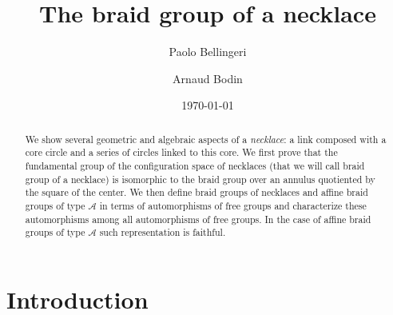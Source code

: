\documentclass[11pt]{amsart}
\title{The braid group of a necklace}
\date{\today}
\author{Paolo Bellingeri}
\author{Arnaud Bodin}
\begin{document}
\begin{abstract}
We show several geometric and algebraic aspects of a \emph{necklace}:
a link composed with a core circle and a series of circles linked to this core.
We first prove that the fundamental group of the configuration space of necklaces 
(that we will call  braid group of a necklace) is 
isomorphic to  the braid group over an annulus quotiented by the square of the center.
We then define   braid groups of necklaces and  affine braid groups of type $\mathcal{A}$
in terms  of  automorphisms of  free groups and characterize these automorphisms 
among all automorphisms of free groups.  In the case of affine braid groups of type $\mathcal{A}$
such representation is faithful.
\end{abstract}

\maketitle

\section{Introduction}
\end{document}
